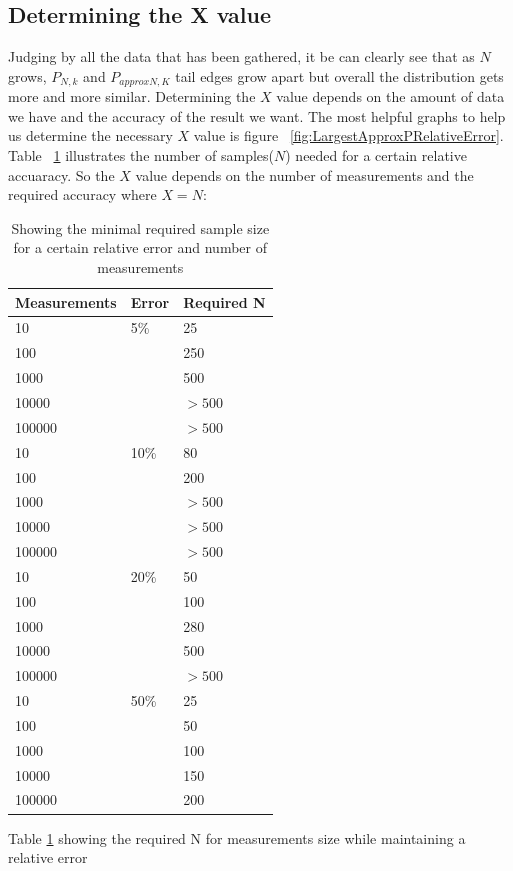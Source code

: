 \documentclass[12pt]{article}
\begin{document}
\subsection{Determining the X value}
Judging by all the data that has been gathered, it be can clearly see that as $N$ grows, $P_{N, k}$ and $P_{approx N, K}$ tail edges grow apart but overall the distribution gets more and more similar. Determining the $X$ value depends on the amount of data we have and the accuracy of the result we want. The most helpful graphs to help us determine the necessary $X$ value is figure ~\ref{fig:LargestApproxPRelativeError}. Table ~\ref{table:requiredN} illustrates the number of samples($N$) needed for a certain relative accuaracy. So the $X$ value depends on the number of measurements and the required accuracy where $X = N$:

\begin{table}[!h]
	\begin{center}
		\caption{Showing the minimal required sample size for a certain relative error and number of measurements}
	    \begin{tabular}{| l | l | l |}
	    \hline
		Measurements & Error & Required N \\
		\hline
		10 & 5\% & 25 \\
		100 & & 250 \\
		1000 & & 500 \\
		10000 & & $>500$ \\
		100000 & & $> 500$ \\
		\hline
		10  & 10\% & 80 \\
		100 & & 200 \\
		1000 & & $>500$ \\
		10000 & & $>500$ \\
		100000  & & $>500$ \\
		\hline
		10  & 20\% & 50 \\
		100 & & 100 \\
		1000  & & 280 \\
		10000  & & 500 \\
		100000  & & $>500$ \\
		\hline
		10  & 50\% &  25 \\
		100 & & 50 \\
		1000 & & 100 \\
		10000 & & 150 \\
		100000 & & 200 \\
		\hline
		\end{tabular}
		\label{table:requiredN}
	\end{center}
\end{table}
Table \ref{table:requiredN} showing the required N for measurements size while maintaining a relative error
\end{document}

